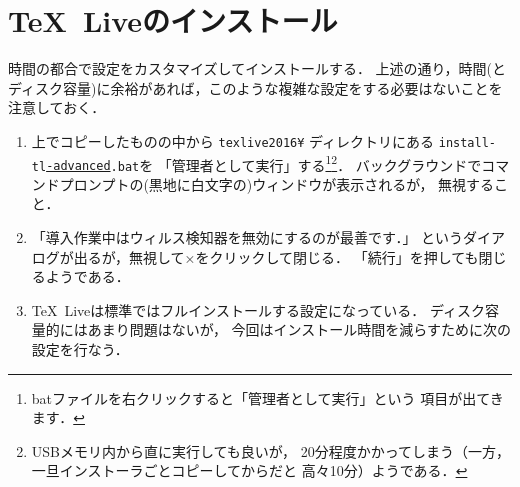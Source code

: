 \documentclass{ltjsarticle}
\begin{document}
\newpage
\section{\TeX~Liveのインストール}
時間の都合で設定をカスタマイズしてインストールする．
上述の通り，時間(とディスク容量)に余裕があれば，このような複雑な設定をする必要はないことを注意しておく．
\begin{enumerate}
  \itemsep\medskipamount


\item 上でコピーしたものの中から \texttt{texlive2016¥} ディレクトリにある
  \texttt{install-tl\underline{-advanced}.bat}を
  「管理者として実行」する\footnote{%
    batファイルを右クリックすると「管理者として実行」という
    項目が出てきます．
  }\footnote{%
    USBメモリ内から直に実行しても良いが，
    20分程度かかってしまう（一方，一旦インストーラごとコピーしてからだと
    高々10分）ようである．
  }．
  \smallskip
  バックグラウンドでコマンドプロンプトの(黒地に白文字の)ウィンドウが表示されるが，
  無視すること．

\item 「導入作業中はウィルス検知器を無効にするのが最善です．」
  というダイアログが出るが，無視して×をクリックして閉じる．
  「続行」を押しても閉じるようである．

\item \TeX~Liveは標準ではフルインストールする設定になっている．
  ディスク容量的にはあまり問題はないが，
  今回はインストール時間を減らすために次の設定を行なう．


\end{enumerate}
\end{document}
